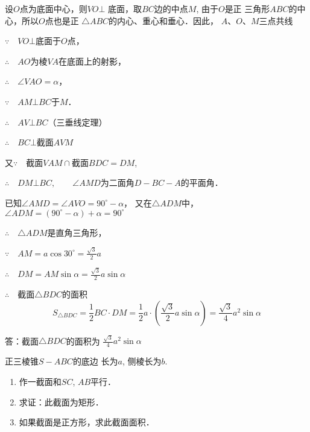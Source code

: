 \begin{solution}
    设$O$点为底面中心，则$VO\bot$
底面，取$BC$边的中点$M$, 由于$O$是正
三角形$ABC$的中心，所以$O$点也是正
$\triangle ABC$的内心、重心和垂心．因此，
$A$、$O$、$M$三点共线

$\because\quad VO\bot$底面于$O$点，

$\therefore\quad AO$为棱$VA$在底面上的射影，

$\therefore\quad \angle VAO=\alpha$，

$\because\quad AM\bot BC$于$M$．

$\therefore\quad AV\bot BC$\qquad （三垂线定理）

$\therefore\quad BC\bot$截面$AVM$

又$\because\quad $截面$VAM\cap$截面$BDC=DM$, 

$\therefore\quad DM\bot BC,\qquad \angle AMD$为二面角$D-BC-A$的平面角．

已知$\angle AMD=\angle AVO=90^{\circ}-\alpha$，
又在$\triangle ADM$中，$\angle ADM=(90^{\circ}-\alpha)+\alpha=90^{\circ}$

$\therefore\quad \triangle ADM$是直角三角形，

$\because\quad AM=a\cos 30^{\circ}=\frac{\sqrt{3}}{2}a$

$\therefore\quad DM=AM\sin\alpha=\frac{\sqrt{3}}{2}a\sin\alpha$

$\therefore\quad $截面$\triangle BDC$的面积
\[S_{\triangle BDC}=\frac{1}{2}BC\cdot DM=\frac{1}{2}a\cdot \left(\frac{\sqrt{3}}{2}a\sin\alpha\right)=\frac{\sqrt{3}}{4}a^2\sin\alpha\]

答：截面$\triangle BDC$的面积为
$\frac{\sqrt{3}}{4}a^2\sin\alpha$
\end{solution}

\begin{example}
    正三棱锥$S-ABC$的底边
    长为$a$, 侧棱长为$b$. 
    
\begin{enumerate}
\item 作一截面和$SC$, $AB$平行．
    \item 求证：此截面为矩形．
    \item 如果截面是正方形，求此截面面积．
\end{enumerate}
\end{example}


\begin{figure}[htp]
    \centering
{}
    \caption{}
\end{figure}

